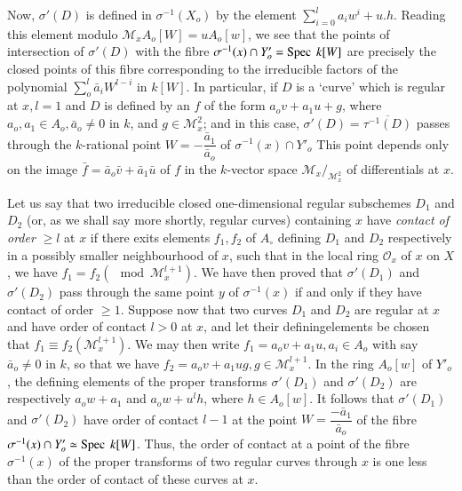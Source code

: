 Now, $\sigma '(D)$ is defined in $\sigma^{-1}(X_o)$ by the element
$\sum\limits^l_{i=0} a_i w^i + u. h$.  Reading this element modulo
$\mathcal{M}_x A_o [W] = u A_o [w]$, we see that the points of
intersection of $\sigma'(D)$ with the fibre $\sigma^{-1}(x) \cap Y '_o
= \operatorname{Spec} ~ k[W]$ are precisely the closed points of this fibre
corresponding to the irreducible factors of the polynomial
$\sum\limits^{l}_{o} \bar{a}_i W^{l-i}$ in $k[W]$. In particular, if $D$
is a `curve' which is regular at $x, l=1$ and $D$ is defined by an $f$
of the form $a_o v + a_1 u + g$, where $a_o, a_1 \in A_o, \bar{a}_o
\neq 0$ in $k$, and $g \in \mathcal{M}^{2}_x $; and in this case,
$\sigma '(D) = \overline{\tau^{-1}(D)}$ passes through the
$k$-rational point $W = - \dfrac {\bar{a}_1}{\bar{a}_o}$ of
$\sigma^{-1} (x) \cap Y '_o$ This point depends only on the image
$\bar{f} = \bar{a}_o \bar{v} + \bar{a}_1 \bar{u}$ of $f$ in the
$k$-vector space $\mathcal{M}_x/_{ \mathcal{M}_x^2} $ of differentials
at $x$. 

Let us say that two irreducible closed one-dimensional regular
subschemes $D_1$ and $D_2$ (or, as we shall say more shortly, regular
curves) containing $x$ have \textit{contact of order} $\ge l$ at $x$
if there exits elements $f_1, f_2$ of $A_\circ$ defining $D_1$ and
$D_2$ respectively in a possibly smaller neighbourhood of $x$, such
that in the local ring $\mathscr{O}_x$ of $x$ on $X$, we have $f_1 =
f_2 (\mod \mathcal{M}^{l+1}_x)$. We have then proved that $\sigma
'(D_1)$ and $\sigma'(D_2)$ pass through the same point $y$ of
$\sigma^{-1}(x)$ if and only if they have contact of order $\geq 1$.
Suppose now that two curves $D_1$ and $D_2$ are regular at $x$ and
have order of contact $l > 0$ at $x$, and let their
defining\pageoriginale elements 
be chosen that $f_1 \equiv f_2 (\mathcal{M}^{l+1}_x)$. We may then
write $f_1 = a_o v + a_1 u, a_i \in A_o$ with say $\bar{a}_o \neq 0$
in $k$, so that we have $f_2 = a_o v + a_1 u g, g \in
\mathcal{M}^{l+1} _x$. In the ring $A_o [w]$ of $Y '_o$, the defining
elements of the proper transforms $\sigma '(D_1)$ and $\sigma'(D_2)$
are respectively $a_ow + a_1$ and $a_o w + u^l h$, where $h \in A_o
[w]$. It follows that $\sigma '(D_1)$ and $\sigma'(D_2)$ have order of
contact $l-1$ at the point $W = \dfrac{-\bar{a}_1}{\bar{a}_o}$ of the
fibre $\sigma^{-1}(x) \cap Y'_o \simeq \operatorname{Spec} ~ k [W]$. Thus, the
order of contact at a point of the fibre $\sigma^{-1} (x)$ of the
proper transforms of two regular curves through $x$ is one less than
the order of contact of these curves at $x$.
